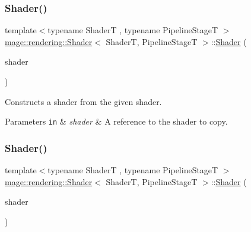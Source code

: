 \subsubsection{\texorpdfstring{Shader()}{Shader()}\hspace{0.1cm}{\footnotesize\ttfamily [2/3]}}
{\footnotesize\ttfamily template$<$typename ShaderT , typename Pipeline\+StageT $>$ \\
\mbox{\hyperlink{classmage_1_1rendering_1_1_shader}{mage\+::rendering\+::\+Shader}}$<$ ShaderT, Pipeline\+StageT $>$\+::\mbox{\hyperlink{classmage_1_1rendering_1_1_shader}{Shader}} (\begin{DoxyParamCaption}\item[{const \mbox{\hyperlink{classmage_1_1rendering_1_1_shader}{Shader}}$<$ ShaderT, Pipeline\+StageT $>$ \&}]{shader }\end{DoxyParamCaption})\hspace{0.3cm}{\ttfamily [delete]}}

Constructs a shader from the given shader.


\begin{DoxyParams}[1]{Parameters}
\mbox{\tt in}  & {\em shader} & A reference to the shader to copy. \\
\hline
\end{DoxyParams}
\mbox{\label{classmage_1_1rendering_1_1_shader_a65ecc5e4958ce06d7dfa8632dccc774f}} 
\subsubsection{\texorpdfstring{Shader()}{Shader()}\hspace{0.1cm}{\footnotesize\ttfamily [3/3]}}
{\footnotesize\ttfamily template$<$typename ShaderT , typename Pipeline\+StageT $>$ \\
\mbox{\hyperlink{classmage_1_1rendering_1_1_shader}{mage\+::rendering\+::\+Shader}}$<$ ShaderT, Pipeline\+StageT $>$\+::\mbox{\hyperlink{classmage_1_1rendering_1_1_shader}{Shader}} (\begin{DoxyParamCaption}\item[{\mbox{\hyperlink{classmage_1_1rendering_1_1_shader}{Shader}}$<$ ShaderT, Pipeline\+StageT $>$ \&\&}]{shader }\end{DoxyParamCaption})\hspace{0.3cm}{\ttfamily [noexcept]}}

